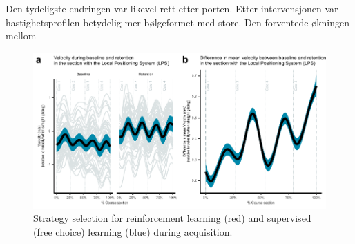 \documentclass{article}
\begin{document}
Den tydeligste endringen var likevel rett etter porten. Etter intervensjonen var hastighetsprofilen betydelig mer bølgeformet med store. Den forventede økningen mellom


\begin{figure}[H]
\centering
\includegraphics{figurer/figure_velocity_2.pdf}
\caption{Strategy selection for reinforcement learning (red) and supervised (free choice) learning (blue) during acquisition.}\label{fig: velocity}
\end{figure}








\printbibliography %
\end{document}
